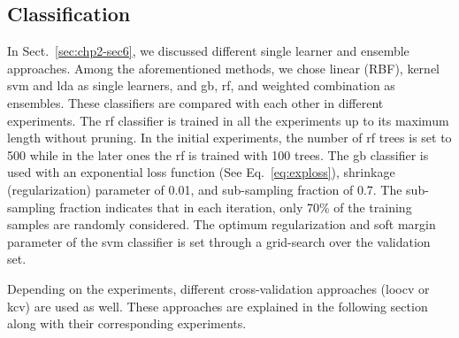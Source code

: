 \subsection{Classification}\label{chp3-subsec6}
In Sect.~\ref{sec:chp2-sec6}, we discussed different single learner and ensemble approaches. 
Among the aforementioned methods, we chose linear (RBF), kernel \ac{svm} and \ac{lda} as single learners, and \ac{gb}, \ac{rf}, and weighted combination as ensembles.
These classifiers are compared with each other in different experiments.
The \ac{rf} classifier is trained in all the experiments up to its maximum length without pruning.
In the initial experiments, the number of \ac{rf} trees is set to 500 while in the later ones the \ac{rf} is trained with 100 trees.
The \ac{gb} classifier is used with an exponential loss function (See Eq.~\ref{eq:exploss}), shrinkage (regularization) parameter of 0.01, and sub-sampling fraction of 0.7. 
The sub-sampling fraction indicates that in each iteration, only 70\% of the training samples are randomly considered.
The optimum regularization and soft margin parameter of the \ac{svm} classifier is set through a grid-search over the validation set. 

Depending on the experiments, different cross-validation approaches (\ac{loocv} or \ac{kcv}) are used as well.
These approaches are explained in the following section along with their corresponding experiments.

